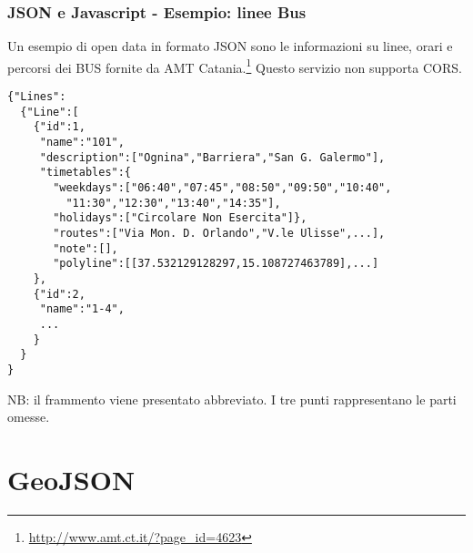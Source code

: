 \documentclass[8pt]{beamer}
\begin{document}
\begin{frame}[fragile]
 \frametitle{JSON e Javascript - Esempio: linee Bus}
 Un esempio di open data in formato JSON sono le informazioni su linee, 
 orari e percorsi dei BUS fornite da AMT Catania.\footnote{\url{http://www.amt.ct.it/?page_id=4623}}
 Questo servizio non supporta CORS.
 
\begin{verbatim}
{"Lines":
  {"Line":[
    {"id":1,
     "name":"101",
     "description":["Ognina","Barriera","San G. Galermo"],
     "timetables":{
       "weekdays":["06:40","07:45","08:50","09:50","10:40",
         "11:30","12:30","13:40","14:35"],
       "holidays":["Circolare Non Esercita"]},
       "routes":["Via Mon. D. Orlando","V.le Ulisse",...],
       "note":[],
       "polyline":[[37.532129128297,15.108727463789],...]
    },
    {"id":2,
     "name":"1-4",
     ...
    }
  }
}
\end{verbatim}

\begin{small}
NB: il frammento viene presentato abbreviato. I tre punti rappresentano le parti omesse. 
\end{small}
\end{frame}

\section{GeoJSON}
\end{document}
